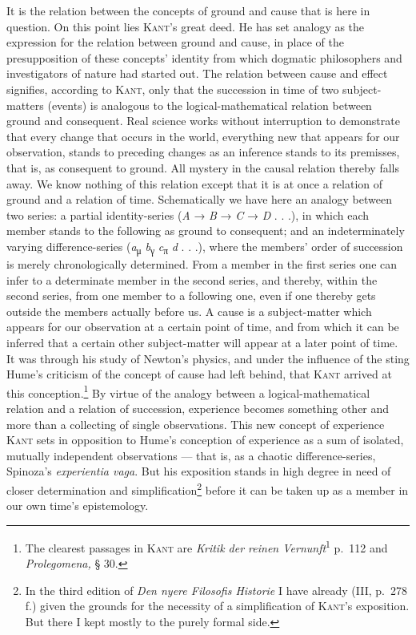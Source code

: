 \documentclass[12pt]{book}
\newcommand{\opage}[1]{\marginnote{\footnotesize\textit{[#1]}}}
\begin{document}
It is the relation between the concepts of ground and cause that is here in
question. On this point lies \textsc{Kant}'s great deed. He has set analogy as
the expression for the relation between ground and cause, in place of the
presupposition of these concepts' identity from which dogmatic philosophers and
investigators of nature had started out. The relation between cause and effect
signifies, according to \textsc{Kant}, only that the succession in time of two
subject-matters (events) is analogous to the logical-mathematical relation
between ground and consequent. Real science works without interruption to
demonstrate that every change that occurs in the world, everything new that
appears for our observation, stands to preceding changes as an inference stands
to its premisses, that is, as consequent to ground. All mystery in the causal
relation thereby falls away. We know nothing of this relation except that it is
at once a relation of ground and a relation of time. Schematically we have here
an analogy between two series: a partial identity-series (\textit{A} →
\textit{B} → \textit{C} → \textit{D} . . .), in which each member stands to the
following as ground to consequent; and an indeterminately varying
difference-series (\textit{a}\textsubscript{μ} \textit{b}\textsubscript{γ}
\textit{c}\textsubscript{π} \textit{d} . . .), where the members' order of
succession is merely chronologically determined. From a member in the first
series one can infer to a determinate member in the second series, and thereby,
within the second series, from \opage{90}one member to a following one, even if one thereby
gets outside the members actually before us. A cause is a subject-matter which
appears for our observation at a certain point of time, and from which it can be
inferred that a certain other subject-matter will appear at a later point of
time. It was through his study of Newton's physics, and under the influence of
the sting Hume's criticism of the concept of cause had left behind, that
\textsc{Kant} arrived at this conception.\footnote{The clearest passages in
\textsc{Kant} are \textit{Kritik der reinen Vernunft}\textsuperscript{1} p.\ 112
and \textit{Prolegomena,} § 30.} By virtue of the analogy between a
logical-mathematical relation and a relation of succession, experience becomes
something other and more than a collecting of single observations. This new
concept of experience \textsc{Kant} sets in opposition to Hume's conception of
experience as a sum of isolated, mutually independent observations --- that is,
as a chaotic difference-series, Spinoza's \textit{experientia vaga}. But his
exposition stands in high degree in need of closer determination and
simplification\footnote{In the third edition of \textit{Den nyere Filosofis
Historie} I have already (III, p.\ 278 f.) given the grounds for the necessity of
a simplification of \textsc{Kant}'s exposition. But there I kept mostly to the
purely formal side.} before it can be taken up as a member in our own time's
epistemology.
\end{document}
